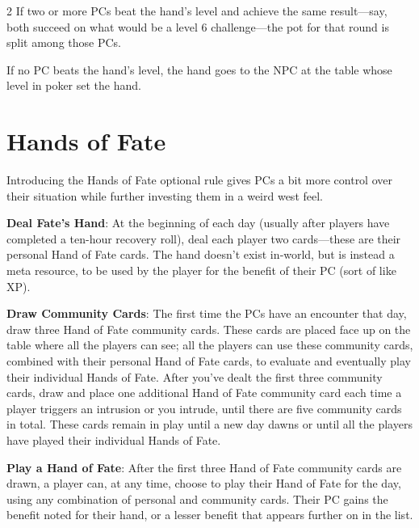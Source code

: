 \begin{multicols}{2}
If two or more PCs beat the hand’s level and achieve the same result—say, both succeed on what would be a level 6 challenge—the pot for that round is split among those PCs. 

If no PC beats the hand’s level, the hand goes to the NPC at the table whose level in poker set the hand.

\chapter{Hands of Fate}
 
Introducing the Hands of Fate optional rule gives PCs a bit more control over their situation while further investing them in a weird west feel.

\textbf{Deal Fate’s Hand}: At the beginning of each day (usually after players have completed a ten-hour recovery roll), deal each player two cards—these are their personal Hand of Fate cards. The hand doesn’t exist in‑world, but is instead a meta resource, to be used by the player for the benefit of their PC (sort of like XP).

\textbf{Draw Community Cards}: The first time the PCs have an encounter that day, draw three Hand of Fate community cards. These cards are placed face up on the table where all the players can see; all the players can use these community cards, combined with their personal Hand of Fate cards, to evaluate and eventually play their individual Hands of Fate. After you’ve dealt the first three community cards, draw and place one additional Hand of Fate community card each time a player triggers an intrusion or you intrude, until there are five community cards in total. These cards remain in play until a new day dawns or until all the players have played their individual Hands of Fate.

\textbf{Play a Hand of Fate}: After the first three Hand of Fate community cards are drawn, a player can, at any time, choose to play their Hand of Fate for the day, using any combination of personal and community cards. Their PC gains the benefit noted for their hand, or a lesser benefit that appears further on in the list. 


\end{multicols}
